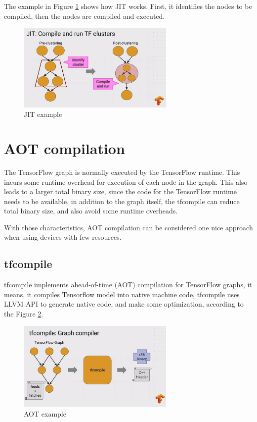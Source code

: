 \documentclass[11pt, fleqn]{article}
\begin{document}
The example in Figure \ref{fig:xla_jitex} shows how JIT works. First, it identifies the nodes to be compiled, then the nodes are compiled and executed.

\begin{figure}[h]
    \centering
    \includegraphics[width=0.68\textwidth]{img/jit_ex.png}
    \caption{JIT example}
    \label{fig:xla_jitex}
\end{figure}

\section{AOT compilation}

The TensorFlow graph is normally executed by the TensorFlow runtime. This incurs some runtime overhead for execution of each node in the graph. This also leads to a larger total binary size, since the code for the TensorFlow runtime needs to be available, in addition to the graph itself, the tfcompile can reduce total binary size, and also avoid some runtime overheads.

With those characteristics, AOT compilation can be considered one nice approach when using devices with few resources.

\subsection{tfcompile}

tfcompile implements ahead-of-time (AOT) compilation for TensorFlow graphs, it means, it compiles Tensorflow model into native machine code, tfcompile uses LLVM API to generate native code, and make some optimization, according to the Figure \ref{fig:xla_aotex}.

\begin{figure}[h]
    \centering
    \includegraphics[width=0.68\textwidth]{img/aot_ex.png}
    \caption{AOT example}
    \label{fig:xla_aotex}
\end{figure}
\end{document}

